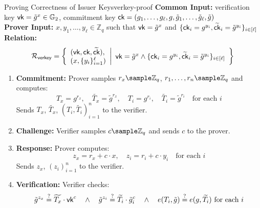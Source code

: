 \begin{protocol}{Proving Correctness of Issuer Keys}{verkey-proof}\label{prot:verkey_proof}
\textbf{Common Input:} verification key $\mathsf{vk} = \tilde{g}^x \in \mathbb{G}_2$, commitment key $\mathsf{ck} = (g_1, \dots, g_{\ell}, g, \tilde{g}_1, \dots, \tilde{g}_{\ell}, \tilde{g})$ \\
\textbf{Prover Input:} $x, y_1, \dots, y_{\ell} \in \mathbb{Z}_q$ such that $\mathsf{vk} = \tilde{g}^x$ and $\{\mathsf{ck}_i = g^{y_i}, \widetilde{\mathsf{ck}}_i = \tilde{g}^{y_i}\}_{i \in [\ell]}$\\
\textbf{Relation:} 
\[
\mathcal{R}_{\mathsf{verkey}} = \left\{
\begin{array}{l}
    (\vk, \ck, \widetilde{\ck}),\\
    (x, \{y_i\}_{i=1}^\ell)
\end{array}
 \middle|
 \begin{array}{l}
      \vk = \tilde{g}^x \wedge \{\ck_i = g^{y_i}, \widetilde{\ck}_i = \tilde{g}^{y_i}\}_{i \in [\ell]}       %
 \end{array}
  \right\}
\]
\begin{enumerate}
    \item \textbf{Commitment:} Prover samples $r_x \sample \mathbb{Z}_q$, $r_1, \dots, r_n \sample \mathbb{Z}_q$ and computes:
    \[
    T_{x} = g^{r_x}, \quad \widetilde{T_{x}} = \tilde{g}^{r_x}, \quad T_{i} = g^{r_i}, \quad \widetilde{T_{i}} = \tilde{g}^{r_i} \quad \text{for each } i
    \]
    Sends $T_{x}$, $\widetilde{T_{x}}$, $(T_{i}, \widetilde{T_{i}})_{i=1}^n$ to the verifier.

    \item \textbf{Challenge:} Verifier samples $c \sample \mathbb{Z}_q$ and sends $c$ to the prover.

    \item \textbf{Response:} Prover computes:
    \[
    z_x = r_x + c \cdot x, \quad z_i = r_i + c \cdot y_i \quad \text{for each } i
    \]
    Sends $z_x$, $(z_i)_{i=1}^n$ to the verifier.

    \item \textbf{Verification:} Verifier checks:
    \[
    \tilde{g}^{z_x} \stackrel{?}{=} \widetilde{T_{x}} \cdot \mathsf{vk}^c \quad \wedge \quad \tilde{g}^{z_i} \stackrel{?}{=} \widetilde{T_{i}} \cdot \tilde{g}_i^c \quad \wedge \quad e(T_{i}, \tilde{g}) \stackrel{?}{=} e(g, \widetilde{T_{i}}) \text{ for each $i$}
    \]
\end{enumerate}
\end{protocol}

